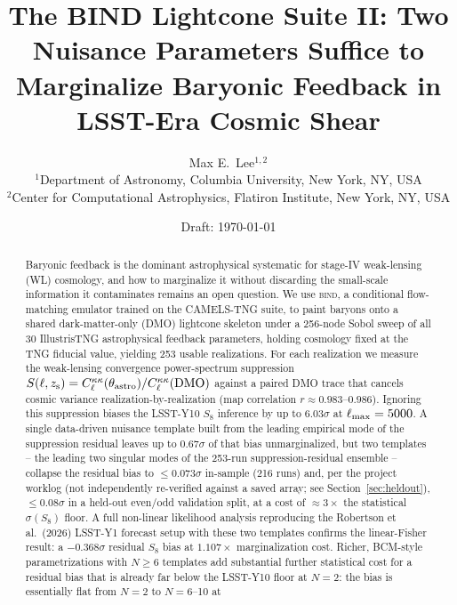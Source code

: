 \documentclass[11pt]{article}
\title{The BIND Lightcone Suite II: Two Nuisance Parameters Suffice to
Marginalize Baryonic Feedback in LSST-Era Cosmic Shear}
\author{%
  Max E.\ Lee$^{1,2}$ \todo{author list to be finalized}\\[2pt]
  \small $^1$Department of Astronomy, Columbia University, New York, NY, USA\\
  \small $^2$Center for Computational Astrophysics, Flatiron Institute, New York, NY, USA
}
\date{Draft: \today}
\newcommand{\bind}{\textsc{bind}}
\newcommand{\sez}{S(\ell, z_{\rm s})}
\begin{document}
\maketitle

\begin{abstract}
Baryonic feedback is the dominant astrophysical systematic for stage-IV weak-lensing
(WL) cosmology, and how to marginalize it without discarding the small-scale
information it contaminates remains an open question.
We use \bind, a conditional flow-matching emulator trained on the CAMELS-TNG
suite, to paint baryons onto a shared dark-matter-only (DMO) lightcone skeleton
under a 256-node Sobol sweep of all 30 IllustrisTNG astrophysical feedback
parameters, holding cosmology fixed at the TNG fiducial value, yielding 253
usable realizations. %
For each realization we measure the weak-lensing convergence power-spectrum
suppression $\sez=C_\ell^{\kappa\kappa}(\theta_{\rm astro})/C_\ell^{\kappa\kappa}({\rm DMO})$
against a paired DMO trace that cancels cosmic variance realization-by-realization
(map correlation $r\approx0.983$--$0.986$). %
Ignoring this suppression biases the LSST-Y10 $S_8$ inference by up to $6.03\sigma$
at $\ell_{\rm max}=5000$. %
A single data-driven nuisance template built from the leading empirical mode of the
suppression residual leaves up to $0.67\sigma$ of that bias unmarginalized,
but two templates -- the leading two singular modes of the 253-run suppression-residual
ensemble -- collapse the residual bias to $\le0.073\sigma$ in-sample (216 runs) and,
per the project worklog (not independently re-verified against a saved array; see
Section~\ref{sec:heldout}), $\le0.08\sigma$ in a held-out even/odd validation split,
at a cost of $\approx3\times$ the statistical $\sigma(S_8)$ floor. %
A full non-linear likelihood analysis reproducing the Robertson et al.\ (2026)
LSST-Y1 forecast setup with these two templates confirms the linear-Fisher result:
a $-0.368\sigma$ residual $S_8$ bias at $1.107\times$ marginalization cost. %
Richer, BCM-style parametrizations with $N\ge6$ templates add substantial further
statistical cost for a residual bias that is already far below the LSST-Y10 floor at
$N=2$: the bias is essentially flat from $N=2$ to $N=6$--10 at

\end{abstract}
\end{document}

